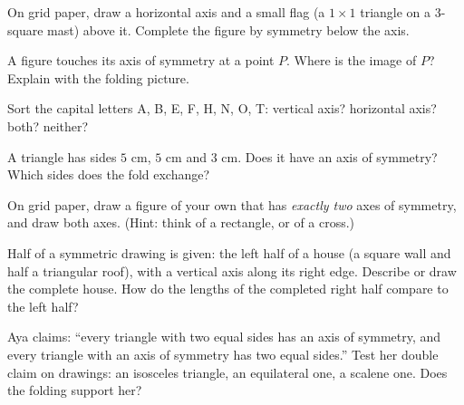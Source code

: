 \begin{exercise}[$\star$]\label{exo:g4:symmetry:5}
On grid paper, draw a horizontal axis and a small flag (a $1 \times
1$ triangle on a $3$-square mast) above it. Complete the figure by
symmetry below the axis.
\end{exercise}

\begin{exercise}[$\star$]\label{exo:g4:symmetry:6}
A figure touches its axis of symmetry at a point $P$. Where is the
image of $P$? Explain with the folding picture.
\end{exercise}

\begin{exercise}[$\star$]\label{exo:g4:symmetry:7}
Sort the capital letters A, B, E, F, H, N, O, T: vertical axis?
horizontal axis? both? neither?
\end{exercise}

\begin{exercise}[$\star$]\label{exo:g4:symmetry:8}
A triangle has sides $5$ cm, $5$ cm and $3$ cm. Does it have an
axis of symmetry? Which sides does the fold exchange?
\end{exercise}

\begin{exercise}[$\star\star$]\label{exo:g4:symmetry:9}
On grid paper, draw a figure of your own that has \emph{exactly two}
axes of symmetry, and draw both axes. (Hint: think of a rectangle,
or of a cross.)
\end{exercise}

\begin{exercise}[$\star\star$]\label{exo:g4:symmetry:10}
Half of a symmetric drawing is given: the left half of a house
(a square wall and half a triangular roof), with a vertical axis
along its right edge. Describe or draw the complete house. How do
the lengths of the completed right half compare to the left half?
\end{exercise}

\begin{exercise}[$\star\star$]\label{exo:g4:symmetry:11}
Aya claims: ``every triangle with two equal sides has an axis of
symmetry, and every triangle with an axis of symmetry has two equal
sides.'' Test her double claim on drawings: an isosceles triangle,
an equilateral one, a scalene one. Does the folding support her?
\end{exercise}
